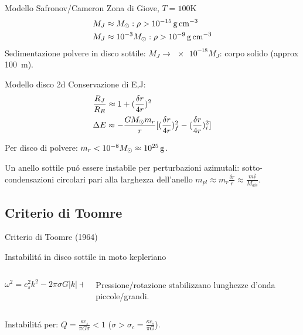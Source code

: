 \begin{wordonframe}{Modello Safronov/Cameron}
Zona di Giove, $T=100\si{\kelvin}$
\begin{align*}
&M_J\approx \msun{}: \rho>\SI{e-15}{\gram\per\cubic\cm}\\
&M_J\approx \num{e-3}\msun{}: \rho>\SI{e-9}{\gram\per\cubic\cm}
\end{align*}
Sedimentazione polvere in disco sottile: $M_J\to\num{e-18}M_J$: corpo solido (approx \SI{100}{\meter}).

\begin{block}{Modello disco 2d}
Conservazione di E,J:
\begin{align*}
&\frac{R_J}{R_E}\approx1+(\frac{\delta r}{4r})^2\\
&\Delta E\approx-\frac{GM_{\odot}{}m_r}{r}[(\frac{\delta r}{4r})^2_f-(\frac{\delta r}{4r})^2_i]
\end{align*}

Per disco di polvere: $m_r<\num{e-8}M_{\odot}{}\approx\SI{e25}{\gram}$.

Un anello sottile pu\'o essere instabile per perturbazioni azimutali: sotto-condensazioni circolari pari alla larghezza dell'anello $m_{pl}\approx m_r\frac{\delta r}{r}\approx\frac{m_r^2}{M_{dis}}$.

\end{block}

\end{wordonframe}

\subsection{Criterio di Toomre}

\begin{frame}{Criterio di Toomre (1964)}

\begin{block}{Instabilit\'a in disco sottile in moto kepleriano}

\begin{columns}

\begin{column}{0.5\textwidth}
\begin{equation*}
\omega^2=c_s^2k^2-2\pi\sigma G|k|+\kappa^2
\end{equation*}
\end{column}
\begin{column}{0.5\textwidth}
Pressione/rotazione stabilizzano lunghezze d'onda piccole/grandi.
\end{column}

\end{columns}

Instabilit\'a per: $Q=\frac{\kappa c_s}{\pi G\sigma}<1$ ($\sigma>\sigma_c=\frac{\kappa c_s}{\pi G}$).

\end{block}

\end{frame}

